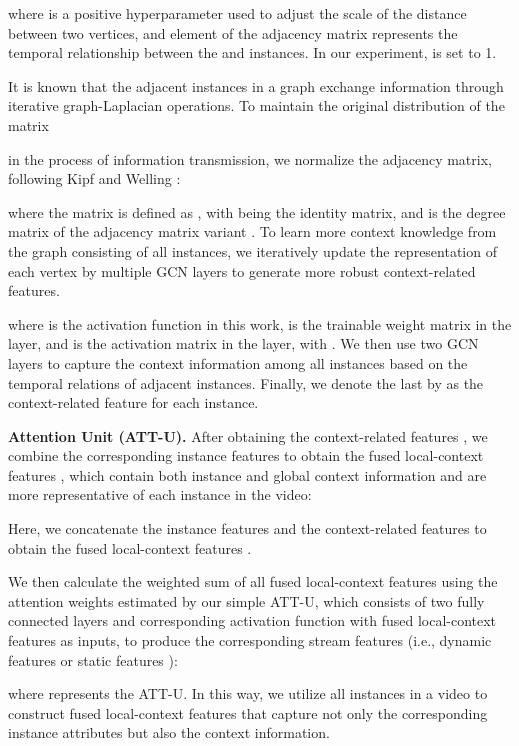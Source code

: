 \documentclass[sigconf]{acmart}
\begin{document}
where  is a positive hyperparameter used to adjust the scale of the distance between two vertices, and element  of the adjacency matrix  represents the temporal relationship between the  and  instances. In our experiment,  is set to 1.

It is known that the adjacent instances in a graph exchange information through iterative graph-Laplacian operations.
To maintain the original distribution of the matrix 

in the process of information transmission, we normalize the adjacency matrix, following Kipf and Welling \cite{kipf2016semi}:

where the matrix  is defined as , with  being the identity matrix, and  is the degree matrix of the adjacency matrix variant .
To learn more context knowledge from the graph  consisting of all instances, we iteratively update the representation of each vertex by multiple GCN layers to generate more robust context-related features.

where  is the  activation function in this work,  is the trainable weight matrix in the  layer, and  is the activation matrix in the  layer, with . We then use two GCN layers to capture the context information among all instances based on the temporal relations of adjacent instances. Finally, we denote the last  by  as the context-related feature for each instance.

\vspace{5pt}

\noindent\textbf{Attention Unit (ATT-U).} After obtaining the context-related features , we combine the corresponding instance features to obtain the fused local-context features , which contain both instance and global context information and are more representative of each instance in the video:



Here, we concatenate the instance features  and the context-related features  to obtain the fused local-context features .

We then calculate the weighted sum of all fused local-context features using the attention weights  estimated by our simple ATT-U, which consists of two fully connected layers and corresponding activation function with fused local-context features as inputs, to produce the corresponding stream features  (i.e., dynamic features  or static features ):

where  represents the ATT-U. In this way, we utilize all instances in a video to construct fused local-context features that capture not only the corresponding instance attributes but also the context information.
\end{document}

